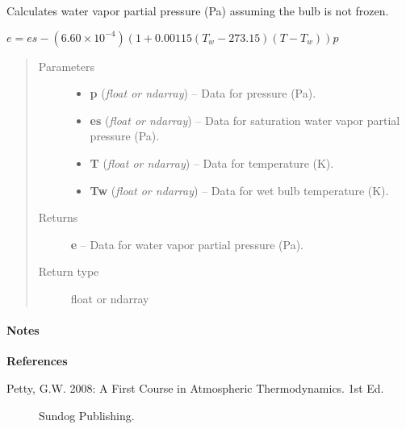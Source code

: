 \documentclass[letterpaper,10pt,english]{sphinxmanual}
\begin{document}

\begin{fulllineitems}
\label{atmos:atmos.equations.e_from_p_es_T_Tw}
Calculates water vapor partial pressure (Pa) assuming the bulb is not frozen.

\(e = es - (6.60 \times 10^{-4}) (1 + 0.00115 (T_w-273.15) (T-T_w)) p\)
\begin{quote}\begin{description}
\item[{Parameters}] \leavevmode\begin{itemize}
\item {} 
\textbf{p} (\emph{float or ndarray}) -- Data for pressure (Pa).

\item {} 
\textbf{es} (\emph{float or ndarray}) -- Data for saturation water vapor partial pressure (Pa).

\item {} 
\textbf{T} (\emph{float or ndarray}) -- Data for temperature (K).

\item {} 
\textbf{Tw} (\emph{float or ndarray}) -- Data for wet bulb temperature (K).

\end{itemize}

\item[{Returns}] \leavevmode
\textbf{e} --
Data for water vapor partial pressure (Pa).

\item[{Return type}] \leavevmode
float or ndarray

\end{description}\end{quote}
\paragraph{Notes}

\textbf{References}
\begin{description}
\item[{Petty, G.W. 2008: A First Course in Atmospheric Thermodynamics. 1st Ed.}] \leavevmode
Sundog Publishing.

\end{description}

\end{fulllineitems}
\end{document}
